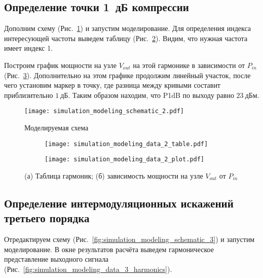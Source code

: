 \subsection{Определение точки 1~дБ компрессии}

Дополним схему (Рис.~\ref{fig:simulation_modeling_schematic_2}) и запустим моделирование.
Для определения индекса интересующей частоты выведем таблицу (Рис.~\ref{fig:simulation_modeling_data_2_table}).
Видим, что нужная частота имеет индекс 1.

Построим график мощности на узле $V_{out}$ на этой гармонике в зависимости от $P_{in}$ (Рис.~\ref{fig:simulation_modeling_data_2_plot}).
Дополнительно на этом графике продолжим линейный участок, после чего установим маркер в точку, где разница между кривыми составит приблизительно $1~\text{дБ}$.
Таким образом находим, что P1dB по выходу равно $23~\text{дБм}$.

\begin{figure}[!ht]
    \centering
    \texttt{[image: simulation\_modeling\_schematic\_2.pdf]}
    \caption{Моделируемая схема}%
    \label{fig:simulation_modeling_schematic_2}
\end{figure}

\begin{figure}[!ht]
    \centering
    \begin{subfigure}[b]{0.3\textwidth}
        \centering
        \texttt{[image: simulation\_modeling\_data\_2\_table.pdf]}
        \caption{}%
        \label{fig:simulation_modeling_data_2_table}
    \end{subfigure}
    \hfill
    \begin{subfigure}[b]{0.6\textwidth}
        \centering
        \texttt{[image: simulation\_modeling\_data\_2\_plot.pdf]}
        \caption{}%
        \label{fig:simulation_modeling_data_2_plot}
    \end{subfigure}
    \caption{%
        (а) Таблица гармоник;
        (б) зависимость мощности на узле $V_{out}$ от $P_{in}$
    }%
    \label{fig:simulation_modeling_data_2}
\end{figure}

\subsection{Определение интермодуляционных искажений третьего порядка}

Отредактируем схему (Рис.~\ref{fig:simulation_modeling_schematic_3}) и запустим моделирование.
В окне результатов расчёта выведем гармоническое представление выходного сигнала (Рис.~\ref{fig:simulation_modeling_data_3_harmonics}).

